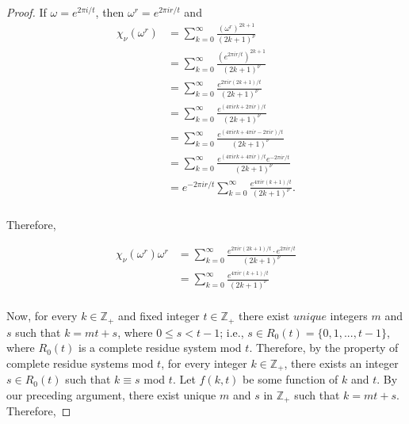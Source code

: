 \documentclass[../article.tex]{subfiles}
\begin{document}
\begin{proof}
If $\omega = e^{2\pi i/t}$, then $\omega^r = e^{2 \pi i r/t}$ and
\begin{equation}
\begin{split}
\chi_{\nu}(\omega^{r}) &= \sum_{k=0}^{\infty} \frac{(\omega^r)^{2k+1}}{(2k+1)^{\nu}} \\
&= \sum_{k=0}^{\infty} \frac{(e^{2 \pi i r/t})^{2k+1}}{(2k+1)^{\nu}} \\
&= \sum_{k=0}^{\infty} \frac{e^{2 \pi i r(2k+1)/t}}{(2k+1)^{\nu}} \\
&= \sum_{k=0}^{\infty} \frac{e^{(4 \pi irk +2\pi i r)/t}}{(2k+1)^{\nu}} \\
&= \sum_{k=0}^{\infty} \frac{e^{(4 \pi irk +4 \pi ir - 2\pi i r)/t}}{(2k+1)^{\nu}} \\
&= \sum_{k=0}^{\infty} \frac{e^{(4 \pi irk +4 \pi ir)/t}e^{- 2\pi i r/t}}{(2k+1)^{\nu}} \\
&= e^{- 2\pi i r/t} \sum_{k=0}^{\infty} \frac{e^{4 \pi i r(k+1)/t}}{(2k+1)^{\nu}}. \\
\end{split}
\end{equation}

Therefore,

\begin{equation}
\begin{split}
\chi_{\nu}(\omega^r)\omega^r &= \sum_{k=0}^{\infty} \frac{e^{2 \pi i r(2k+1)/t} \cdot e^{2 \pi i r/t}}{(2k+1)^{\nu}} \\
&= \sum_{k=0}^{\infty} \frac{e^{4 \pi i r(k+1)/t}}{(2k+1)^{\nu}} \\
\end{split}
\end{equation}

Now, for every $k \in \mathbb{Z}_{+}$ and fixed integer $t \in \mathbb{Z}_{+}$ there exist $unique$ integers $m$ and $s$ such that $k = mt +s$, where $0 \leq s < t-1$; i.e., $s \in R_{0}(t) = \{0, 1, ..., t-1\}$, where $R_{0}(t)$ is a complete residue system mod $t$. Therefore, by the property of complete residue systems mod $t$, for every integer $k \in \mathbb{Z}_{+}$, there exists an integer $s \in R_{0}(t)$ such that $k \equiv s$ mod $t$. Let $f(k,t)$ be some function of $k$ and $t$. By our preceding argument, there exist unique $m$ and $s$ in $\mathbb{Z}_{+}$ such that $k = mt +s$. Therefore,


\end{proof}
\end{document}
